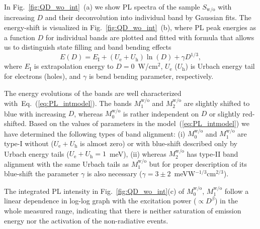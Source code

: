 In Fig.~\ref{fig:QD_wo_int}~(a) we show PL spectra of the sample $S_\mathrm{w/o}$ with increasing $D$ and their deconvolution into individual band by Gaussian fits. The energy-shift is visualized in Fig.~\ref{fig:QD_wo_int}~(b), where PL peak energies as a function $D$ for individual bands are plotted and fitted with %
%
formula that allows us to distinguish state filling and band bending effects~\cite{Abramkin_blueshift_analytical}
%
\begin{equation}
E(D)=E_\mathrm{I}+\left(U_\mathrm{e}+U_\mathrm{h}\right) \ln\left(D \right)+\gamma D^{1/3}, \label{eq:PL_intmodel}
\end{equation}
%
where $E_\mathrm{I}$ is extrapolation energy to $D=0$~W/cm$^2$, $U_\mathrm{e}$ ($U_\mathrm{h}$) is Urbach energy tail for electrons (holes), and $\gamma$ is bend bending parameter, respectively.%

The energy evolutions of the bands are well characterized with~Eq.~(\ref{eq:PL_intmodel}). The bands $M_1^\mathrm{w/o}$ and $M_2^\mathrm{w/o}$ are slightly shifted to blue with increasing $D$, whereas $M_0^\mathrm{w/o}$ is rather independent on $D$ or slightly red-shifted. Based on the values of parameters in the model~(\ref{eq:PL_intmodel}) we have determined the following types of band alignment: (i) $M_0^\mathrm{w/o}$ and $M_1^\mathrm{w/o}$ are type-I without ($U_\mathrm{e}+U_\mathrm{h}$ is almost zero) or with blue-shift described only by Urbach energy tails ($U_\mathrm{e}+U_\mathrm{h}=1$~meV), (ii) whereas $M_2^\mathrm{w/o}$ has type-II band alignment with the same Urbach tails as $M_1^\mathrm{w/o}$ but for proper description of its blue-shift the parameter $\gamma$ is also necessary ($\gamma=3\pm2$~meVW$^{-1/3}$cm$^{2/3}$).


The integrated PL intensity in Fig.~\ref{fig:QD_wo_int}(c) of $M_0^\mathrm{w/o}$, $M_1^\mathrm{w/o}$ follow a linear dependence in log-log graph with the excitation power ($\propto D^\beta$) in the whole measured range, indicating that there is neither saturation of emission energy nor the activation of the non-radiative events.{}

